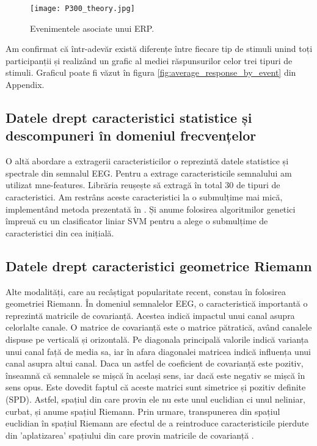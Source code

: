 \vspace{1em}
\begin{figure}[H]
    \centering
		\vspace{-1em}
    \texttt{[image: P300\_theory.jpg]}
    \caption{Evenimentele asociate unui ERP\cite{P300_image}.}
		\vspace{-1em}
    \label{fig:enter-label}
\end{figure}

Am confirmat că într-adevăr există diferențe între fiecare tip de stimuli unind toți participanții și realizând un grafic al mediei răspunsurilor celor trei tipuri de stimuli. Graficul poate fi văzut în figura \ref{fig:average_response_by_event} din Appendix.

\subsection{Datele drept caracteristici statistice și descompuneri în domeniul frecvențelor}

O altă abordare a extragerii caracteristicilor o reprezintă datele statistice și spectrale din semnalul EEG. Pentru a extrage caracteristicile semnalului am utilizat mne-features\cite{mne-features}. Librăria reușește să extragă în total 30 de tipuri de caracteristici. Am restrâns aceste caracteristici la o submulțime mai mică, implementând metoda prezentată în \cite{ga_svm}. Și anume folosirea algoritmilor genetici împreuă cu un clasificator liniar SVM pentru a alege o submulțime de caracteristici din cea inițială. 

\subsection{Datele drept caracteristici geometrice Riemann}
Alte modalități, care au recâștigat popularitate recent, constau în folosirea geometriei Riemann. În domeniul semnalelor EEG, o caracteristică importantă o reprezintă matricile de covarianță. Acestea indică impactul unui canal asupra celorlalte canale. O matrice de covarianță este o matrice pătratică, având canalele dispuse pe verticală și orizontală. Pe diagonala principală valorile indică varianța unui canal față de media sa, iar în afara diagonalei matricea indică influența unui canal asupra altui canal. Daca un astfel de coeficient de covarianță este pozitiv, înseamnă că semnalele se mișcă în același sens, iar dacă este negativ se mișcă în sens opus. Este dovedit faptul că aceste matrici sunt simetrice și pozitiv definite (SPD). Astfel, spațiul din care provin ele nu este unul euclidian ci unul neliniar, curbat, și anume spațiul Riemann. Prin urmare, transpunerea din spațiul euclidian în spațiul Riemann are efectul de a reintroduce caracteristicile pierdute din 'aplatizarea' spațiului din care provin matricile de covarianță \cite{riemann_geometry}.

